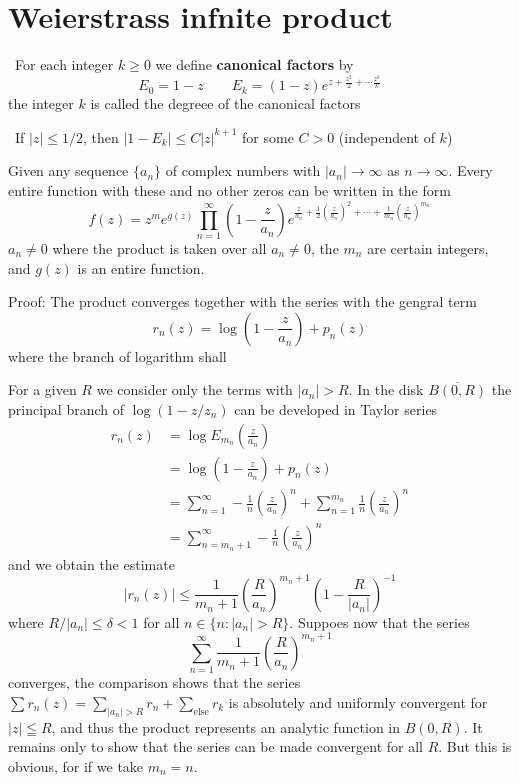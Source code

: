\documentclass[12pt, oneside]{book}
\begin{document}
\section{Weierstrass infnite product}
\begin{definition}\
    For each integer $k\geq0$ we define \textbf{canonical factors} by
    $$E_0=1-z\quad\quad E_k=(1-z)e^{z+\frac{z^2}{2}+\cdots\frac{z^k}{k}}$$
    the integer $k$ is called the degreee of the canonical factors
\end{definition}
\begin{lemma}\
    If $\left|z\right|\leq 1/2$, then $\left|1-E_k\right|\leq C\left|z\right|^{k+1}$ for some $C>0$ (independent of $k$)
\end{lemma}
\begin{theorem}[Weierstrass]
    Given any sequence $\{ a_n\}$ of complex numbers with $\left|a_n\right|\to\infty$ as $n\to \infty$. Every entire function with these and no other zeros can be written in the form
    $$f(z)=z^m e^{g(z)} \prod_{n=1}^{\infty}\left(1-\frac{z}{a_n}\right) e^{\frac{z}{a_n}+\frac{1}{2}\left(\frac{z}{a_n}\right)^2+\cdots+\frac{1}{m_n}\left(\frac{z}{a_n}\right)^{m_n}}$$
    $a_n \neq 0$
    where the product is taken over all $a_n \neq 0$, the $m_n$ are certain integers, and $g(z)$ is an entire function.

    Proof: The product converges together with the series with the gengral term
    $$r_n(z)=\log\left(1-\frac{z}{a_n}\right)+p_n(z)$$
    where the branch of logarithm shall

    For a given $R$ we consider only the terms with $\left|a_n\right|>R$. In the disk $\overline{B(0,R)}$ the principal branch of $\log(1-z/z_n)$ can be developed in Taylor series
    $$\begin{aligned}
            r_n(z) & =\log E_{m_n}\left(\frac{z}{a_n}\right)                                                                               \\
                   & =\log\left(1-\frac{z}{a_n}\right)+p_n(z)                                                                              \\
                   & =\sum_{n=1}^\infty -\frac{1}{n}\left(\frac{z}{a_n}\right)^n+ \sum_{n=1}^{m_n} \frac{1}{n}\left(\frac{z}{a_n}\right)^n \\
                   & =\sum_{n=m_n+1}^\infty -\frac{1}{n}\left(\frac{z}{a_n}\right)^n
        \end{aligned}$$
    and we obtain the estimate
    $$\left|r_n(z)\right|\leq \frac{1}{m_n+1}\left(\frac{R}{a_n}\right)^{m_n+1}\left(1-\frac{R}{\left|a_n\right|}\right)^{-1}$$
    where $R/\left|a_n\right|\leq \delta <1$ for all $n\in \{n:\left|a_n\right|>R\}$. Suppoes now that the series
    $$\sum_{n=1}^\infty \frac{1}{m_n+1}\left(\frac{R}{a_n}\right)^{m_n+1}$$
    converges, the comparison shows that the series $\sum r_n(z)=\sum\limits_{\left|a_n\right|>R}r_n+\sum\limits_{\text{else}}r_k$ is absolutely and uniformly convergent for $|z| \leqq R$, and thus the product represents an analytic function in $B(0,R)$.
    It remains only to show that the series can be made convergent for all $R$. But this is obvious, for if we take $m_n=n$.
\end{theorem}
\end{document}
